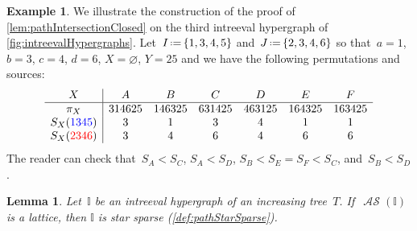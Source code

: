 \documentclass{amsart}
\newtheorem{lemma}[theorem]{Lemma}
\theoremstyle{definition}
\newtheorem{example}[theorem]{Example}
\newcommand{\eqdef}{\mbox{\,\raisebox{0.2ex}{\scriptsize\ensuremath{\mathrm:}}\ensuremath{=}\,}} %
\newcommand{\blue}[1]{{\color{blue} #1}} %
\newcommand{\red}[1]{{\color{red} #1}} %
\DeclareMathOperator{\ASour}{\mathcal{AS}}  %
\newcommand{\II}{\mathbb I} %
\begin{document}
\begin{example}
\label{exm:pathIntersectionClosed}
We illustrate the construction of the proof of \cref{lem:pathIntersectionClosed} on the third intreeval hypergraph of \cref{fig:intreevalHypergraphs}.
Let~$I \eqdef \{1,3,4,5\}$ and~$J \eqdef \{2,3,4,6\}$ so that~$a = 1$, $b = 3$, $c = 4$, $d = 6$, $X = \varnothing$, $Y = 25$ and we have the following permutations and sources:
\[
\begin{array}{c|cccccc}
	X & A & B & C & D & E & F \\
	\hline
	\pi_X & 314625 & 146325 & 631425 & 463125 & 164325 & 163425 \\
	S_X(\blue{1345}) & 3 & 1 & 3 & 4 & 1 & 1 \\
	S_X(\red{2346}) & 3 & 4 & 6 & 4 & 6 & 6
\end{array}
\]
The reader can check that~$S_A < S_C$, $S_A < S_D$, $S_B < S_E = S_F < S_C$, and~$S_B < S_D$.
\end{example}

\begin{lemma}
\label{lem:pathStarSparse}
Let~$\II$ be an intreeval hypergraph of an increasing tree~$T$.
If~$\ASour(\II)$ is a lattice, then $\II$ is star sparse (\cref{def:pathStarSparse}).
\end{lemma}
\end{document}
